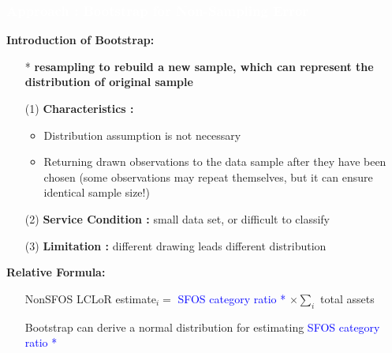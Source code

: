 \documentclass{beamer}	%
\theoremstyle{plain}
\theoremstyle{definition}
\theoremstyle{remark}
\numberwithin{equation}{section}
\begin{document}
\begin{frame}

\frametitle{\textcolor{white}{Approach \uppercase\expandafter{} : Bootstrap for Non-Sampling Error}}

\small
\textbf{Introduction of Bootstrap:}
\begin{itemize}\setlength{\itemsep}{1pt} 
	\scriptsize

	\item[*]\textbf{resampling to rebuild a new sample, which can represent the distribution of original sample}
	\item[(1)]\textbf{Characteristics :} 
 	\begin{itemize}\setlength{\itemsep}{1pt} 
 	\scriptsize
	\item Distribution assumption is not necessary
 	\item Returning drawn observations to the data sample after they have been chosen \quad (some observations may repeat themselves, but it can ensure identical sample size!)
 	\end{itemize}

 	\item[(2)]\textbf{Service Condition :} small data set, or difficult to classify
 	
 	\item[(3)]\textbf{Limitation :} different drawing leads different distribution
\end{itemize}

\textbf{Relative Formula:}\\
\begin{itemize}\setlength{\itemsep}{1pt} 
\scriptsize
\item[]
 NonSFOS LCLoR estimate$_{i}=$ \textcolor{blue}{SFOS category ratio *} $\times \sum_{i}$ total 	assets\\
\item[]
Bootstrap can derive a normal distribution for estimating \textcolor{blue}{ SFOS category ratio *}
\end{itemize}

\end{frame}
\end{document}
